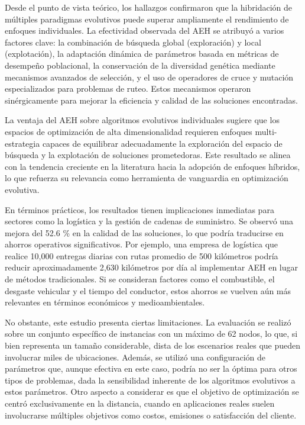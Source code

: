 \documentclass[10pt,a4paper]{article}
\begin{document}
\begin{multicols}{2}
Desde el punto de vista teórico, los hallazgos confirmaron que la hibridación de múltiples paradigmas evolutivos puede superar ampliamente el rendimiento de enfoques individuales. La efectividad observada del AEH se atribuyó a varios factores clave: la combinación de búsqueda global (exploración) y local (explotación), la adaptación dinámica de parámetros basada en métricas de desempeño poblacional, la conservación de la diversidad genética mediante mecanismos avanzados de selección, y el uso de operadores de cruce y mutación especializados para problemas de ruteo. Estos mecanismos operaron sinérgicamente para mejorar la eficiencia y calidad de las soluciones encontradas.

La ventaja del AEH sobre algoritmos evolutivos individuales sugiere que los espacios de optimización de alta dimensionalidad requieren enfoques multi-estrategia capaces de equilibrar adecuadamente la exploración del espacio de búsqueda y la explotación de soluciones prometedoras. Este resultado se alinea con la tendencia creciente en la literatura hacia la adopción de enfoques híbridos, lo que refuerza su relevancia como herramienta de vanguardia en optimización evolutiva.

En términos prácticos, los resultados tienen implicaciones inmediatas para sectores como la logística y la gestión de cadenas de suministro. Se observó una mejora del 52.6 \% en la calidad de las soluciones, lo que podría traducirse en ahorros operativos significativos. Por ejemplo, una empresa de logística que realice 10,000 entregas diarias con rutas promedio de 500 kilómetros podría reducir aproximadamente 2,630 kilómetros por día al implementar AEH en lugar de métodos tradicionales. Si se consideran factores como el combustible, el desgaste vehicular y el tiempo del conductor, estos ahorros se vuelven aún más relevantes en términos económicos y medioambientales.

No obstante, este estudio presenta ciertas limitaciones. La evaluación se realizó sobre un conjunto específico de instancias con un máximo de 62 nodos, lo que, si bien representa un tamaño considerable, dista de los escenarios reales que pueden involucrar miles de ubicaciones. Además, se utilizó una configuración de parámetros que, aunque efectiva en este caso, podría no ser la óptima para otros tipos de problemas, dada la sensibilidad inherente de los algoritmos evolutivos a estos parámetros. Otro aspecto a considerar es que el objetivo de optimización se centró exclusivamente en la distancia, cuando en aplicaciones reales suelen involucrarse múltiples objetivos como costos, emisiones o satisfacción del cliente.


\end{multicols}
\end{document}
